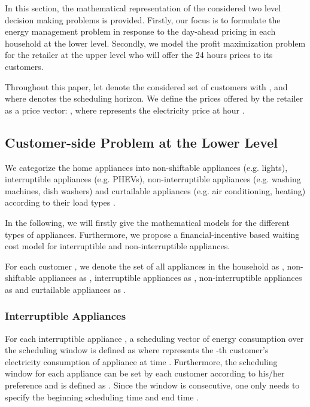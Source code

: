 \documentclass[10pt,journal]{IEEEtran}
\theoremstyle{definition}
\theoremstyle{plain} \newtheorem{theo}{Theorem} \newtheorem{prop}{Proposition}  \newtheorem{lemm}{Lemma}
\begin{document}
In this section, the mathematical representation of the considered two level decision making problems is provided. Firstly, our focus is to formulate the energy management problem in response to the day-ahead pricing in each household at the lower level. Secondly, we model the profit maximization problem for the retailer at the upper level who will offer the 24 hours prices to its customers. 

Throughout this paper, let  denote the considered set of customers with , and   where  denotes the scheduling horizon. We define the prices offered by the retailer as a price vector: , where  represents the electricity price at hour .

\subsection{Customer-side Problem at the Lower Level}












We categorize the home appliances into non-shiftable appliances (e.g. lights), interruptible appliances (e.g.  PHEVs), non-interruptible appliances (e.g. washing machines, dish washers) and curtailable appliances (e.g.  air conditioning, heating) according to their load types \cite{meng2014optimal}.




In the following, we will firstly give the mathematical models for the different types of appliances. Furthermore, we propose a financial-incentive based waiting cost model for interruptible and non-interruptible appliances.

For each customer  , we denote the set of all appliances in the household as , non-shiftable appliances as , interruptible appliances as , non-interruptible appliances as  and curtailable appliances as . 


\subsubsection{Interruptible Appliances}



For each interruptible appliance , a scheduling vector of energy consumption over the scheduling window   is defined as 
where  represents the -th customer's electricity consumption of appliance  at time . Furthermore, the scheduling window for each appliance  can be set by each customer according to his/her preference and is defined as  \cite{Leon-garcia2010}.  Since the window  is consecutive, one only needs to specify the beginning
scheduling time  and end time .
\end{document}
